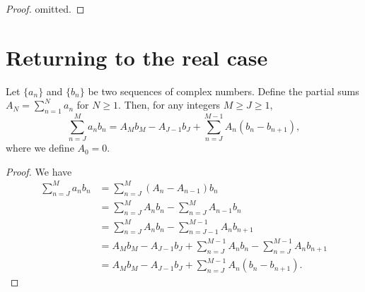\documentclass{elegantbook}
\begin{document}
%

\begin{proof}
  omitted.
\end{proof}


\section{Returning to the real case}

\begin{lemma} \label{lem:abel_summation_formula}
    Let $\{a_n\}$ and $\{b_n\}$ be two sequences of complex numbers. Define the partial sums $A_N = \sum_{n=1}^N a_n$ for $N \geq 1$. Then, for any integers $M \geq J \geq 1$,
    \[
        \sum_{n=J}^M a_n b_n = A_M b_M - A_{J-1} b_{J} + \sum_{n=J}^{M-1} A_n (b_n - b_{n+1}),
    \]
    where we define $A_0 = 0$.
\end{lemma}

\begin{proof}
    We have
    \begin{align*}
        \sum_{n=J}^M a_n b_n &= \sum_{n=J}^M (A_n - A_{n-1}) b_n \\
        &= \sum_{n=J}^M A_n b_n - \sum_{n=J}^M A_{n-1} b_n \\
        &= \sum_{n=J}^M A_n b_n - \sum_{n=J-1}^{M-1} A_n b_{n+1} \\
        &= A_M b_M - A_{J-1} b_J + \sum_{n=J}^{M-1} A_n b_n - \sum_{n=J}^{M-1} A_n b_{n+1} \\
        &= A_M b_M - A_{J-1} b_J + \sum_{n=J}^{M-1} A_n (b_n - b_{n+1}).
    \end{align*}
\end{proof}
\end{document}
